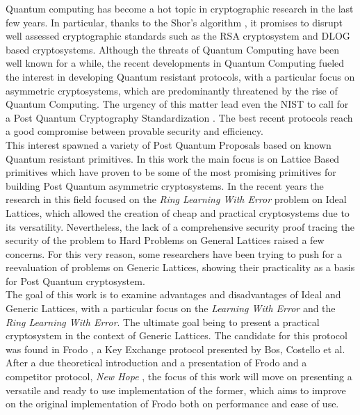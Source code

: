 Quantum computing has become a hot topic in cryptographic research in the last few years. In particular, thanks to the Shor's algorithm \cite{ShorAlgo}, it promises to disrupt well assessed cryptographic standards such as the RSA cryptosystem and DLOG based cryptosystems. Although the threats of Quantum Computing have been well known for a while, the recent developments in Quantum Computing fueled the interest in developing Quantum resistant protocols, with a particular focus on asymmetric cryptosystems, which are predominantly threatened by the rise of Quantum Computing. The urgency of this matter lead even the NIST to call for a Post Quantum Cryptography Standardization \cite{NIST}. The best recent protocols reach a good compromise between provable security and efficiency.\\
This interest spawned a variety of Post Quantum Proposals based on known Quantum resistant primitives. In this work the main focus is on Lattice Based primitives which have proven to be some of the most promising primitives for building Post Quantum asymmetric cryptosystems. In the recent years the research in this field focused on the \textit{Ring Learning With Error} problem on Ideal Lattices, which allowed the creation of cheap and practical cryptosystems due to its versatility. Nevertheless, the lack of a comprehensive security proof tracing the security of the problem to Hard Problems on General Lattices raised a few concerns. For this very reason, some researchers have been trying to push for a reevaluation of problems on Generic Lattices, showing their practicality as a basis for Post Quantum cryptosystem.\\
The goal of this work is to examine advantages and disadvantages of Ideal and Generic Lattices, with a particular focus on the \textit{Learning With Error} and the \textit{Ring Learning With Error}. The ultimate goal being to present a practical cryptosystem in the context of Generic Lattices. The candidate for this protocol was found in Frodo \cite{frodo}, a Key Exchange protocol presented by Bos, Costello et al. After a due theoretical introduction and a presentation of Frodo and a competitor protocol, \textit{New Hope} \cite{newhope}, the focus of this work will move on presenting a versatile and ready to use implementation of the former, which aims to improve on the original implementation of Frodo both on performance and ease of use.
